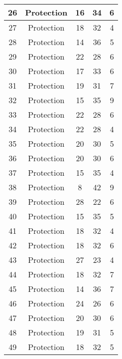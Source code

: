 \documentclass[results.tex]{subfiles}
\begin{document}
\begin{center}
\begin{tabular}{| c || c | c | c | c |}
    \hline
    26 & Protection & 16 & 34 & 6 \\ 
    \hline
    27 & Protection & 18 & 32 & 4 \\ 
    \hline
    28 & Protection & 14 & 36 & 5 \\ 
    \hline
    29 & Protection & 22 & 28 & 6 \\ 
    \hline
    30 & Protection & 17 & 33 & 6 \\ 
    \hline
    31 & Protection & 19 & 31 & 7 \\ 
    \hline
    32 & Protection & 15 & 35 & 9 \\ 
    \hline
    33 & Protection & 22 & 28 & 6 \\ 
    \hline
    34 & Protection & 22 & 28 & 4 \\ 
    \hline
    35 & Protection & 20 & 30 & 5 \\ 
    \hline
    36 & Protection & 20 & 30 & 6 \\ 
    \hline
    37 & Protection & 15 & 35 & 4 \\ 
    \hline
    38 & Protection & 8 & 42 & 9 \\ 
    \hline
    39 & Protection & 28 & 22 & 6 \\ 
    \hline
    40 & Protection & 15 & 35 & 5 \\ 
    \hline
    41 & Protection & 18 & 32 & 4 \\ 
    \hline
    42 & Protection & 18 & 32 & 6 \\ 
    \hline
    43 & Protection & 27 & 23 & 4 \\ 
    \hline
    44 & Protection & 18 & 32 & 7 \\ 
    \hline
    45 & Protection & 14 & 36 & 7 \\ 
    \hline
    46 & Protection & 24 & 26 & 6 \\ 
    \hline
    47 & Protection & 20 & 30 & 6 \\ 
    \hline
    48 & Protection & 19 & 31 & 5 \\ 
    \hline
    49 & Protection & 18 & 32 & 5 \\ 
    \hline   \end{tabular}
\end{center}
\end{document}
